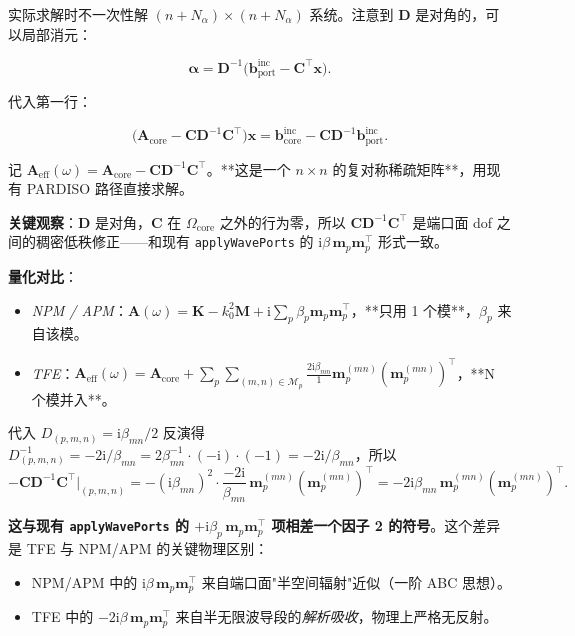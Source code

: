\documentclass[11pt,a4paper]{ctexart}
\newcommand{\im}{\mathrm{i}}
\begin{document}
实际求解时不一次性解 $(n + N_\alpha) \times (n + N_\alpha)$ 系统。注意到 $\bm D$ 是对角的，可以局部消元：

\[
  \bm \alpha = \bm D^{-1}\big(\bm b_{\text{port}}^{\text{inc}} - \bm C^{\!\top}\bm x\big).
\]

代入第一行：

\[
  \big(\bm A_{\text{core}} - \bm C \bm D^{-1} \bm C^{\!\top}\big) \bm x
   = \bm b_{\text{core}}^{\text{inc}} - \bm C \bm D^{-1} \bm b_{\text{port}}^{\text{inc}}.
\]

记 $\bm A_{\text{eff}}(\omega) = \bm A_{\text{core}} - \bm C \bm D^{-1} \bm C^{\!\top}$。**这是一个 $n \times n$ 的复对称稀疏矩阵**，用现有 PARDISO 路径直接求解。

\textbf{关键观察}：$\bm D$ 是对角，$\bm C$ 在 $\Omega_{\text{core}}$ 之外的行为零，所以 $\bm C \bm D^{-1} \bm C^{\!\top}$ 是端口面 dof 之间的稠密低秩修正——和现有 \texttt{applyWavePorts} 的 $\im\beta\,\bm m_p \bm m_p^{\!\top}$ 形式一致。

\textbf{量化对比}：

\begin{itemize}
\item \emph{NPM / APM}：$\bm A(\omega) = \bm K - k_0^2 \bm M + \im\sum_p \beta_p \bm m_p \bm m_p^{\!\top}$，**只用 1 个模**，$\beta_p$ 来自该模。
\item \emph{TFE}：$\bm A_{\text{eff}}(\omega) = \bm A_{\text{core}} + \sum_p \sum_{(m,n) \in \mathcal M_p} \frac{2\im\beta_{mn}}{1} \bm m_p^{(mn)} (\bm m_p^{(mn)})^{\!\top}$，**N 个模并入**。
\end{itemize}

代入 $D_{(p,m,n)} = \im\beta_{mn}/2$ 反演得 $D^{-1}_{(p,m,n)} = -2\im / \beta_{mn} = 2\beta_{mn}^{-1} \cdot (-\im) \cdot (-1) = -2\im/\beta_{mn}$，所以
\[
  -\bm C \bm D^{-1} \bm C^{\!\top}\big|_{(p,m,n)}
  = -(\im\beta_{mn})^2 \cdot \frac{-2\im}{\beta_{mn}}\,\bm m_p^{(mn)}(\bm m_p^{(mn)})^{\!\top}
  = -2\im\beta_{mn}\,\bm m_p^{(mn)}(\bm m_p^{(mn)})^{\!\top}.
\]

\textbf{这与现有 \texttt{applyWavePorts} 的 $+\im\beta_p\,\bm m_p\bm m_p^{\!\top}$ 项相差一个因子 2 的符号}。这个差异是 TFE 与 NPM/APM 的关键物理区别：

\begin{itemize}
\item NPM/APM 中的 $\im\beta\,\bm m_p\bm m_p^{\!\top}$ 来自端口面"半空间辐射"近似（一阶 ABC 思想）。
\item TFE 中的 $-2\im\beta\,\bm m_p\bm m_p^{\!\top}$ 来自半无限波导段的\emph{解析吸收}，物理上严格无反射。
\end{itemize}
\end{document}
